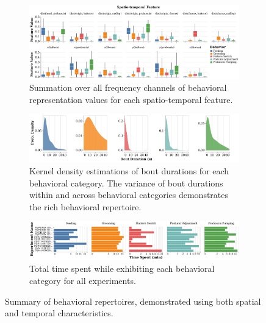\begin{figure}[htb!]
	\centering
	\begin{subfigure}[b]{0.995\linewidth}
		\centering
		\includegraphics[width=\linewidth]{figures/FeatureDistributions_perBehavior-Ann.pdf}
		\caption{Summation over all frequency channels of behavioral representation values for each spatio-temporal feature.\label{figure:feature-distributions}}
	\end{subfigure}%

	\centering
	\begin{subfigure}[b]{0.995\linewidth}
		\centering
		\includegraphics[width=\linewidth]{figures/BoutDurationDistributions-Ann.pdf}
		\caption{Kernel density estimations of bout durations for each behavioral category. The variance of bout durations within and across behavioral categories demonstrates the rich behavioral repertoire. \label{figure:bout-durations}}
	\end{subfigure}%

	\centering
	\begin{subfigure}[b!]{0.995\linewidth}
		\centering
		\includegraphics[width=\linewidth]{figures/TimeSpent-perBehavior-Ann.pdf}
		\caption{Total time spent while exhibiting each behavioral category for all experiments. \label{figure:time-spent-in-behaviors}}
	\end{subfigure}%
	\caption{Summary of behavioral repertoires, demonstrated using both spatial and temporal characteristics. \label{figure:summary-behavior-characteristics}}
\end{figure}

